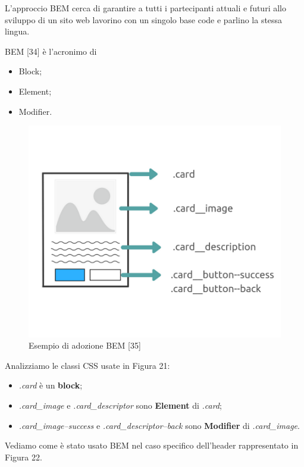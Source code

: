 L'approccio BEM cerca di garantire a tutti i partecipanti attuali e futuri allo sviluppo di un sito web
lavorino con un singolo base code e parlino la stessa lingua. 

BEM [34] è l'acronimo di 
\begin{itemize}
\item Block;
\item Element;
\item Modifier.
\end{itemize}

\begin{figure}[H]
    \centering  
    \caption{Esempio di adozione BEM [35]}
    \includegraphics[scale=0.5]{img/cap3/bem-1}
\end{figure}

Analizziamo le classi CSS usate in Figura 21:

\begin{itemize}
    \item \textit{.card} è un \textbf{block};
    \item \textit{.card{\_}image} e  \textit{.card{\_}descriptor} sono \textbf{Element} di \textit{.card};
    \item \textit{.card{\_}image--success} e  \textit{.card{\_}descriptor--back} sono 
    \textbf{Modifier} di \textit{.card{\_}image}.
\end{itemize}

Vediamo come è stato usato BEM nel caso specifico dell'header rappresentato in Figura 22.

